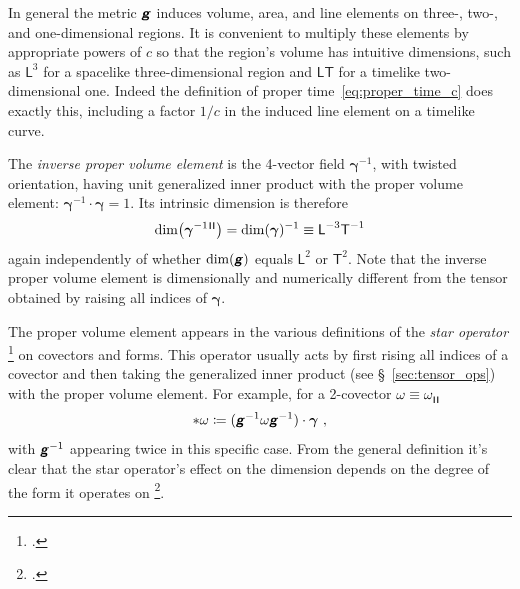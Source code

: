 \documentclass[\ifafour a4paper,12pt,\else a5paper,10pt,\fi%
onecolumn,oneside,article,%
british%
]{memoir}
\makeatletter
\theoremstyle{remark}
\theoremstyle{innote}
\newcommand*{\mathte}[1]{\textbf{\textit{\textsf{#1}}}}
\newcommand*{\citep}{\footcites}
\newcommand*{\defd}{\coloneqq}
\renewcommand*{\|}[1][]{\nonscript\,#1\vert\nonscript\;\mathopen{}}
\newcommand*{\sect}{\S}%
\newcommand*{\sects}{\S\S}%
\newcommand*{\eg}{{e.g.}}
\newcommand*{\cf}{{cf.}}
\newcommand*{\q}{}%
\DeclareRobustCommand*{\q}{%
  \mathord{\mathpalette\bigcdot@{}}%
}
\newcommand*{\bigcdot@scalefactor}{0.7}
\newcommand*{\bigcdot@widthfactor}{1.5}
\newcommand*{\bigcdot@}[2]{%
  \sbox0{$#1\vcenter{}$}%
  \sbox2{$#1\cdot\m@th$}%
  \hbox to \bigcdot@widthfactor\wd2{%
    \hfil
    \raise\ht0\hbox{%
      \scalebox{\bigcdot@scalefactor}{%
        \lower\ht0\hbox{$#1\bullet\m@th$}%
      }%
    }%
    \hfil
  }%
}
\newcommand*{\Le}{\textsf{L}}
\newcommand*{\Ti}{\textsf{T}}
\newcommand*{\Li}{\textsf{L}}
\newcommand*{\ii}{\cdot}
\newcommand*{\yg}{\mathte{g}}
\renewcommand*{\i}{\indices}
\newcommand*{\ygv}{\bm{\gamma}}
\newcommand*{\ygu}{\overline{\ygv}}
\newcommand*{\rul}{{\mkern2mu\rule[-0.1ex]{0.75pt}{1.1ex}\mkern2mu}}
\DeclarePairedDelimiter\mul{\rul}{\rul}%
\makeatother
\begin{document}
In general the metric $\yg$ induces volume, area, and line elements on
three-, two-, and one-dimensional regions. It is convenient to multiply
these elements by appropriate powers of $c$ so that the region's volume has
intuitive dimensions, such as $\Li^{3}$ for a spacelike three-dimensional
region and $\Li\Ti$ for a timelike two-dimensional one. Indeed the
definition of proper time~\eqref{eq:proper_time_c} does exactly this,
including a factor $1/c$ in the induced line element on a timelike curve.

The \emph{inverse proper volume element} is the 4-vector field $\ygv^{-1}$,
with twisted orientation, having unit generalized inner product with the
proper volume element: $\ygv^{-1} \ii \ygv = 1$. Its intrinsic dimension is
therefore
\begin{equation}
  \label{eq:dim_inv_volume_elem}
  \dim\bigl(\ygv^{-1}{}\i{^{\mul{\q\q\q\q}}}\bigr) =
  \dim(\ygv)^{-1} \equiv \Le^{-3}\Ti^{-1}
\end{equation}
again independently of whether $\dim(\yg)$ equals $\Li^{2}$ or $\Ti^{2}$.
Note that the inverse proper volume element is dimensionally and
numerically different from the tensor  obtained by raising all
indices of $\ygv$.%

\medskip

The proper volume element appears in the various definitions of the
\emph{star operator}
\citep[\eg][\sect~V.A.4]{choquetbruhatetal1977_r1996}[Box~4.3]{misneretal1970_r1973}[\sect~IV.24]{burke1985_r1987}
on covectors and forms. This operator usually acts by first rising all
indices of a covector and then taking the generalized inner product (see
\sect~\ref{sec:tensor_ops}) with the proper volume element. For example,
for a 2-covector $\omega \equiv \omega\i{_{\mul{\q\q}}}$
\begin{equation}
  \label{eq:star_op}
  *\omega \defd (\yg^{-1}\omega\yg^{-1})\ii\ygv \ ,
\end{equation}
with $\yg^{-1}$ appearing twice in this specific case. From the general
definition it's clear that the star operator's effect on the dimension
depends on the degree of the form it operates on \citep[I personally prefer
to avoid the star operator and to explicitly use the inner product with the
proper volume element; \cf][\sects~4.1--2]{bossavit1991}.
\end{document}
